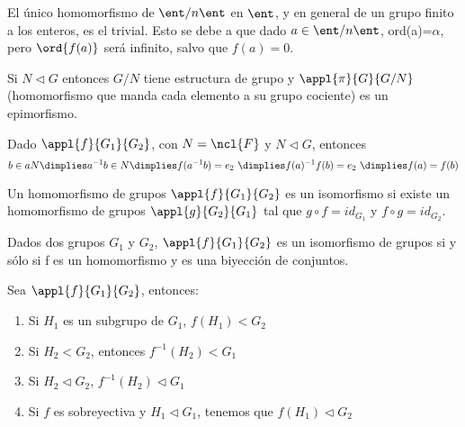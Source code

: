 \documentclass[nochap]{apuntes}
\begin{document}
\begin{remark}El único homomorfismo de $\ent/n\ent$  en $\ent$, y en general de un grupo finito a los enteros, es el trivial. Esto se debe
a que dado $a\in\ent/n\ent$, ord(a)=$\alpha$, pero $\ord{f(a)}$ será infinito, salvo que $f(a)=0$.\end{remark}

\begin{lemma} Si $N\lhd G$ entonces $G/N$ tiene estructura de grupo y $\appl{\pi}{G}{G/N}$  (homomorfismo que manda cada
elemento a su grupo cociente)  es un epimorfismo.
\end{lemma}

\begin{lemma} Dado $\appl{f}{G_1}{G_2}$, con $N=\ncl{F}$ y $N \lhd G$, entonces
\[ b\in aN \dimplies  a^{-1}b\in N \dimplies f(a^{-1}b)=e_2 \ \dimplies f(a)^{-1}f(b)=e_2 \ \dimplies f(a)=f(b) \]
\end{lemma}

\begin{defn}[Isomorfismo]
Un homomorfismo de grupos $\appl{f}{G_1}{G_2}$ es un isomorfismo si existe un homomorfismo de grupos $\appl{g}{G_2}{G_1}$ tal que $g\circ f = id_{G_1}$ y $f\circ g = id_{G_2}$.
\end{defn}

\begin{remark} Dados dos grupos $G_1$ y $G_2$, $\appl{f}{G_1}{G_2}$ es un isomorfismo de grupos si y sólo si f es un homomorfismo y es una biyección de conjuntos.
\end{remark}

\begin{lemma}\label{lemPropsHF}
Sea $\appl{f}{G_1}{G_2}$, entonces:
\begin{enumerate}
\item Si $H_1$ es un subgrupo de $G_1$, $f(H_1)<G_2$
\item Si $H_2 < G_2$, entonces $f^{-1}(H_2)<G_1$
\item Si $H_2 \lhd G_2$, $f^{-1}(H_2)\lhd G_1$
\item Si $f$ es sobreyectiva y $H_1\lhd G_1$, tenemos que $f(H_1)\lhd G_2$
\end{enumerate}
\end{lemma}
\end{document}
